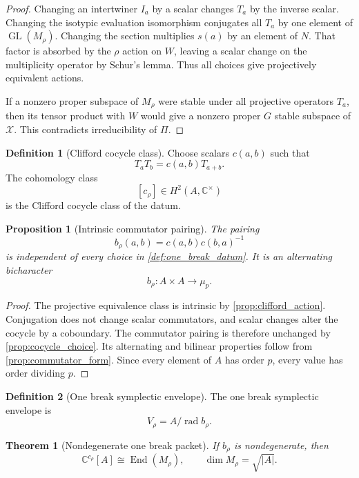 \documentclass[11pt]{amsart}
\newtheorem{theorem}{Theorem}[section]
\newtheorem{proposition}[proposition]{Proposition}
\theoremstyle{definition}
\newtheorem{definition}[definition]{Definition}
\theoremstyle{remark}
\newcommand{\CC}{\mathbb C}
\newcommand{\GL}{\operatorname{GL}}
\newcommand{\End}{\operatorname{End}}
\newcommand{\rad}{\operatorname{rad}}
\newcommand{\abs}[1]{\left\lvert#1\right\rvert}
\newcommand{\calX}{\mathcal X}
\begin{document}
\begin{proof}
Changing an intertwiner \(I_a\) by a scalar changes \(T_a\) by the inverse scalar. Changing the isotypic evaluation isomorphism conjugates all \(T_a\) by one element of \(\GL(M_\rho)\). Changing the section multiplies \(s(a)\) by an element of \(N\). That factor is absorbed by the \(\rho\) action on \(W\), leaving a scalar change on the multiplicity operator by Schur's lemma. Thus all choices give projectively equivalent actions.

If a nonzero proper subspace of \(M_\rho\) were stable under all projective operators \(T_a\), then its tensor product with \(W\) would give a nonzero proper \(G\) stable subspace of \(\calX\). This contradicts irreducibility of \(\Pi\).
\end{proof}

\begin{definition}[Clifford cocycle class]\label{def:clifford_class}
Choose scalars \(c(a,b)\) such that
\[
T_aT_b=c(a,b)T_{a+b}.
\]
The cohomology class
\[
[c_\rho]\in H^2(A,\CC^{\times})
\]
is the Clifford cocycle class of the datum.
\end{definition}

\begin{proposition}[Intrinsic commutator pairing]\label{prop:one_break_form}
The pairing
\[
b_\rho(a,b)
=
c(a,b)c(b,a)^{-1}
\]
is independent of every choice in \cref{def:one_break_datum}. It is an alternating bicharacter
\[
b_\rho:A\times A\to\mu_p.
\]
\end{proposition}

\begin{proof}
The projective equivalence class is intrinsic by \cref{prop:clifford_action}. Conjugation does not change scalar commutators, and scalar changes alter the cocycle by a coboundary. The commutator pairing is therefore unchanged by \cref{prop:cocycle_choice}. Its alternating and bilinear properties follow from \cref{prop:commutator_form}. Since every element of \(A\) has order \(p\), every value has order dividing \(p\).
\end{proof}

\begin{definition}[One break symplectic envelope]\label{def:one_break_envelope}
The one break symplectic envelope is
\[
\boxed{
V_\rho=A/\rad b_\rho.
}
\]
\end{definition}

\begin{theorem}[Nondegenerate one break packet]\label{thm:one_break_matrix}
If \(b_\rho\) is nondegenerate, then
\[
\CC^{c_\rho}[A]
\cong
\End(M_\rho),
\qquad
\dim M_\rho=\sqrt{\abs A}.
\]
\end{theorem}
\end{document}
